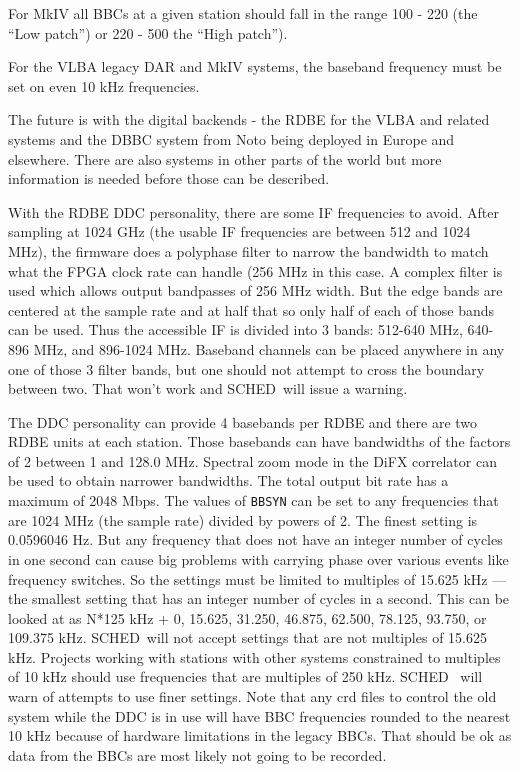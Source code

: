 \documentclass{report}
\newcommand{\schedb}{{\sc SCHED~}}
\begin{document}
For MkIV all BBCs at a given station should fall in the range 100 -
220 (the ``Low patch'') or 220 - 500 the ``High patch'').

For the VLBA legacy DAR and MkIV systems, the baseband frequency must
be set on even 10 kHz frequencies.

The future is with the digital backends - the RDBE for the VLBA and
related systems and the DBBC system from Noto being deployed in Europe
and elsewhere.  There are also systems in other parts of the world but
more information is needed before those can be described.

With the RDBE DDC personality, there are some IF frequencies to avoid.
After sampling at 1024 GHz (the usable IF frequencies are between 512
and 1024 MHz), the firmware does a polyphase filter to narrow the
bandwidth to match what the FPGA clock rate can handle (256 MHz in
this case.  A complex filter is used which allows output bandpasses of
256 MHz width.  But the edge bands are centered at the sample rate and
at half that so only half of each of those bands can be used.  Thus
the accessible IF is divided into 3 bands: 512-640 MHz, 640-896 MHz,
and 896-1024 MHz.  Baseband channels can be placed anywhere in any one
of those 3 filter bands, but one should not attempt to cross the
boundary between two.  That won't work and \schedb will issue a warning.

The DDC personality can provide 4 basebands per RDBE and there are two
RDBE units at each station.  Those basebands can have bandwidths of
the factors of 2 between 1 and 128.0 MHz.  Spectral zoom mode in the
DiFX correlator can be used to obtain narrower bandwidths.  The total
output bit rate has a maximum of 2048 Mbps.  The values of {\tt BBSYN}
can be set to any frequencies that are 1024 MHz (the sample rate)
divided by powers of 2.  The finest setting is 0.0596046 Hz.  But any
frequency that does not have an integer number of cycles in one second
can cause big problems with carrying phase over various events like
frequency switches.  So the settings must be limited to multiples of
15.625 kHz --- the smallest setting that has an integer number of
cycles in a second.  This can be looked at as N*125 kHz + 0, 15.625,
31.250, 46.875, 62.500, 78.125, 93.750, or 109.375 kHz.  \schedb will
not accept settings that are not multiples of 15.625 kHz.  Projects
working with stations with other systems constrained to multiples of
10 kHz should use frequencies that are multiples of 250 kHz.  \schedb
will warn of attempts to use finer settings.  Note that any crd files
to control the old system while the DDC is in use will have BBC
frequencies rounded to the nearest 10 kHz because of hardware
limitations in the legacy BBCs.  That should be ok as data from the
BBCs are most likely not going to be recorded.
\end{document}
